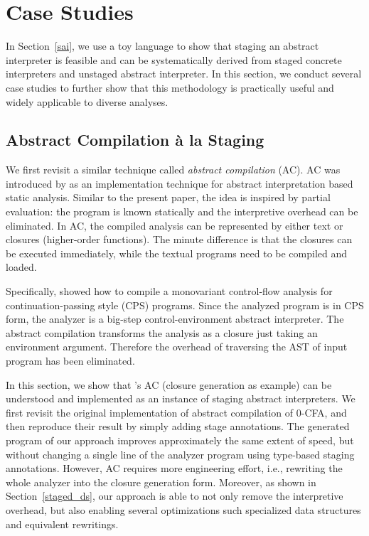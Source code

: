 \section{Case Studies} \label{cases_study}

In Section~\ref{sai}, we use a toy language to show that staging an abstract
interpreter is feasible and can be systematically derived from staged concrete
interpreters and unstaged abstract interpreter.
In this section, we conduct several case studies to further show that this
methodology is practically useful and widely applicable to diverse analyses.

\subsection{Abstract Compilation \`a la Staging} \label{cs_ac}

We first revisit a similar technique called \textit{abstract compilation} (AC).
AC was introduced by \citet{Boucher:1996:ACN:647473.727587} as an
implementation technique for abstract interpretation based static analysis.
Similar to the present paper, the idea is inspired by partial evaluation:
the program is known statically and the interpretive overhead can be
eliminated. In AC, the compiled analysis can be represented by either text or
closures (higher-order functions). The minute difference is that the closures
can be executed immediately, while the textual programs need to be compiled and
loaded.

Specifically, \citeauthor{Boucher:1996:ACN:647473.727587} showed how to compile a
monovariant control-flow analysis \cite{Shivers:1991:SSC:115865.115884,
Shivers:1988:CFA:53990.54007} for continuation-passing style (CPS) programs.
Since the analyzed program is in CPS form, the analyzer is a big-step
control-environment abstract interpreter. The abstract compilation transforms
the analysis as a closure just taking an environment argument. Therefore the
overhead of traversing the AST of input program has been eliminated.

In this section, we show that \citeauthor{Boucher:1996:ACN:647473.727587}'s AC
(closure generation as example) can be understood and implemented as an instance
of staging abstract interpreters. We first revisit the original implementation
of abstract compilation of 0-CFA, and then reproduce their result by simply
adding stage annotations.
The generated program of our approach improves approximately the same extent of
speed, but without changing a single line of the analyzer program using
type-based staging annotations. However, AC requires more engineering effort,
i.e., rewriting the whole analyzer into the closure generation form. Moreover,
as shown in Section~\ref{staged_ds}, our approach is able to not only remove the
interpretive overhead, but also enabling several optimizations such specialized
data structures and equivalent rewritings.

